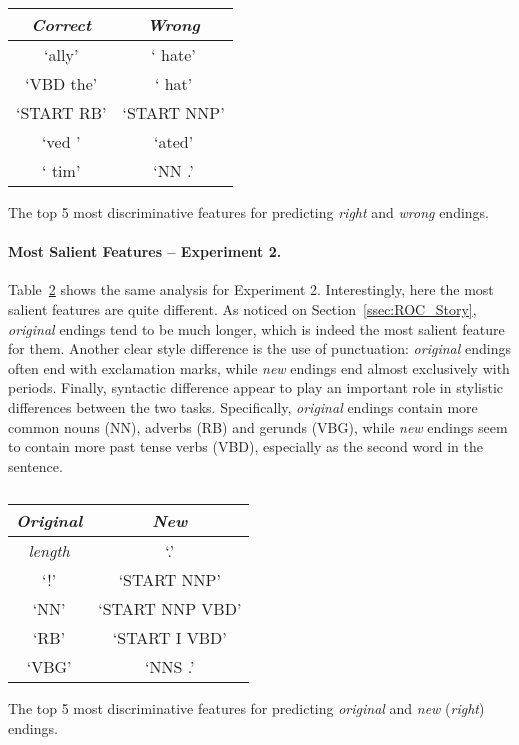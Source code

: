 \documentclass[11pt,a4paper]{article}
\newcommand{\secref}[1]{Section~\ref{ssec:#1}}
\newcommand{\tabref}[1]{Table~\ref{#1}}
\begin{document}
\begin{table}[!t]
\begin{center}
\begin{tabular}{|c|c|} \hline
\textit{\textbf{Correct}} & \textit{\textbf{Wrong}}\\ \hline
`ally' & ` hate'\\ \hline
`VBD the' & ` hat'\\ \hline
`START RB' & `START NNP'\\ \hline
`ved ' & `ated'\\ \hline
` tim' & `NN .'\\ \hline

\end{tabular}
\end{center}
\caption{\label{exp1_features}}
The top 5 most discriminative features for predicting {\it right} and {\it wrong} endings.\end{table}


\paragraph{Most Salient Features -- Experiment 2.}
\tabref{exp2_features} shows the same analysis for Experiment 2.
Interestingly, here the most salient features are quite different. 
As noticed on \secref{ROC_Story}, {\it original} endings tend to be much longer, which is indeed the most salient feature for them.
Another clear style difference is the use of punctuation: {\it original} endings often end with exclamation marks, while {\it new} endings end almost exclusively with periods. 
Finally, syntactic difference appear to play an important role in stylistic differences between the two tasks. 
Specifically, {\it original} endings contain more common nouns (NN), adverbs (RB) and gerunds (VBG), while {\it new} endings seem to contain more past tense verbs (VBD), especially as the second word in the sentence.


\begin{table}[!t]
\begin{center}
\begin{tabular}{|c|c|} \hline
\textit{\textbf{Original}} & \textit{\textbf{New}}\\ \hline
{\it length} & `.'\\ \hline
`!' & `START NNP'\\ \hline
`NN' & `START NNP VBD'\\ \hline
`RB' & `START I VBD'\\ \hline
`VBG' & `NNS .'\\ \hline

\end{tabular}
\end{center}
\caption{\label{exp2_features}}
The top 5 most discriminative features for predicting {\it original} and {\it new} ({\it right}) endings.\end{table}
\end{document}
